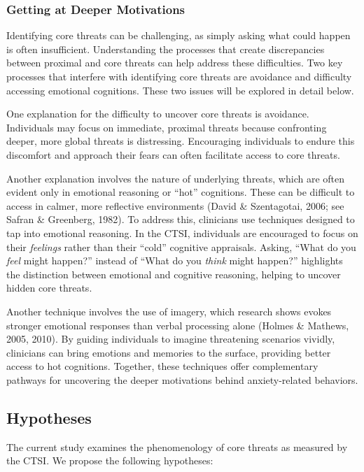 \documentclass[
  man,floatsintext]{apa7}
\begin{document}
\subsubsection{Getting at Deeper Motivations}\label{getting-at-deeper-motivations}

Identifying core threats can be challenging, as simply asking what could happen is often insufficient.
Understanding the processes that create discrepancies between proximal and core threats can help address these difficulties.
Two key processes that interfere with identifying core threats are avoidance and difficulty accessing emotional cognitions.
These two issues will be explored in detail below.

One explanation for the difficulty to uncover core threats is avoidance.
Individuals may focus on immediate, proximal threats because confronting deeper, more global threats is distressing.
Encouraging individuals to endure this discomfort and approach their fears can often facilitate access to core threats.

Another explanation involves the nature of underlying threats, which are often evident only in emotional reasoning or ``hot'' cognitions.
These can be difficult to access in calmer, more reflective environments (David \& Szentagotai, 2006; see Safran \& Greenberg, 1982).
To address this, clinicians use techniques designed to tap into emotional reasoning.
In the CTSI, individuals are encouraged to focus on their \emph{feelings} rather than their ``cold'' cognitive appraisals.
Asking, ``What do you \emph{feel} might happen?'' instead of ``What do you \emph{think} might happen?'' highlights the distinction between emotional and cognitive reasoning, helping to uncover hidden core threats.

Another technique involves the use of imagery, which research shows evokes stronger emotional responses than verbal processing alone (Holmes \& Mathews, 2005, 2010).
By guiding individuals to imagine threatening scenarios vividly, clinicians can bring emotions and memories to the surface, providing better access to hot cognitions.
Together, these techniques offer complementary pathways for uncovering the deeper motivations behind anxiety-related behaviors.

\subsection{Hypotheses}\label{hypotheses}

The current study examines the phenomenology of core threats as measured by the CTSI.
We propose the following hypotheses:
\end{document}
